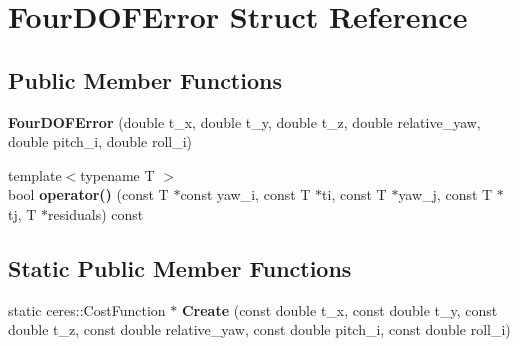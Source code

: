 \hypertarget{structFourDOFError}{}\section{Four\+D\+O\+F\+Error Struct Reference}
\label{structFourDOFError}
\subsection*{Public Member Functions}
\begin{DoxyCompactItemize}
\item 
\mbox{\label{structFourDOFError_a1c6b67d6d0b0285ec75a8e62a11b4064}} 
{\bfseries Four\+D\+O\+F\+Error} (double t\+\_\+x, double t\+\_\+y, double t\+\_\+z, double relative\+\_\+yaw, double pitch\+\_\+i, double roll\+\_\+i)
\item 
\mbox{\label{structFourDOFError_a11ea4a6d6d26a15a17f5bc871b5d3489}} 
{\footnotesize template$<$typename T $>$ }\\bool {\bfseries operator()} (const T $\ast$const yaw\+\_\+i, const T $\ast$ti, const T $\ast$yaw\+\_\+j, const T $\ast$tj, T $\ast$residuals) const
\end{DoxyCompactItemize}
\subsection*{Static Public Member Functions}
\begin{DoxyCompactItemize}
\item 
\mbox{\label{structFourDOFError_a44f1a9e9b89553a7e0468a6debe7d4b6}} 
static ceres\+::\+Cost\+Function $\ast$ {\bfseries Create} (const double t\+\_\+x, const double t\+\_\+y, const double t\+\_\+z, const double relative\+\_\+yaw, const double pitch\+\_\+i, const double roll\+\_\+i)
\end{DoxyCompactItemize}
